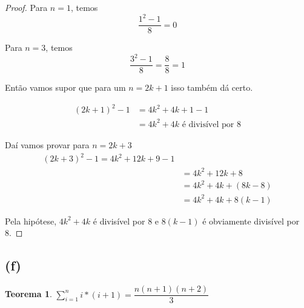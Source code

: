 \documentclass{article}
\begin{document}
\begin{proof}
	Para $n = 1$, temos
	\begin{equation}
		\dfrac{1^2 - 1}{8} = 0
	\end{equation}

	Para $n = 3$, temos
	\begin{equation}
		\dfrac{3^2 - 1}{8} = \dfrac{8}{8} = 1
	\end{equation}

	Então vamos supor que para um $n = 2k + 1$ isso também dá certo.

	\begin{equation}
	\begin{split}
		(2k + 1)^2 - 1 & = 4k^2 + 4k + 1 - 1 \\
		& = 4k^2 + 4k \text{ é divisível por 8}
	\end{split}
	\end{equation}

	Daí vamos provar para $n = 2k + 3$
	\begin{equation}
	\begin{split}
		(2k + 3)^2 - 1 = 4k^2 + 12k + 9 - 1\\
		& = 4k^2 + 12k + 8\\
		& = 4k^2 + 4k + (8k - 8)\\
		& = 4k^2 + 4k + 8(k - 1)
	\end{split}
	\end{equation}

	Pela hipótese, $4k^2 + 4k$ é divisível por 8 e $8(k - 1)$ é obviamente
	divisível por 8.
\end{proof}

\subsection*{(f)}
\newtheorem{teo6}{Teorema}
\begin{teo6}
	$\sum\limits_{i = 1}^{n}i * (i+1) = \dfrac{n(n + 1)(n + 2)}{3} $
\end{teo6}
\end{document}
